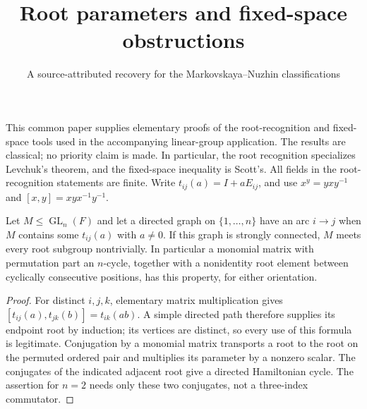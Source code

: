 \documentclass[11pt]{article}
\title{Root parameters and fixed-space obstructions}
\author{A source-attributed recovery for the Markovskaya--Nuzhin classifications}
\date{}
\newcommand{\GL}{\operatorname{GL}}\newcommand{\SL}{\operatorname{SL}}
\begin{document}
\maketitle
This common paper supplies elementary proofs of the root-recognition and
fixed-space tools used in the accompanying linear-group application. The results
are classical; no priority claim is made. In particular, the root recognition
specializes Levchuk's theorem, and the fixed-space inequality is Scott's.
All fields in the root-recognition statements are finite. Write
$t_{ij}(a)=I+aE_{ij}$, and use $x^y=yxy^{-1}$ and
$[x,y]=xyx^{-1}y^{-1}$.

\begin{lemma}\label{propagate}
Let $M\leq\GL_n(F)$ and let a directed graph on $\{1,\ldots,n\}$ have an
arc $i\to j$ when $M$ contains some $t_{ij}(a)$ with $a\ne0$.
If this graph is strongly connected, $M$ meets every root subgroup nontrivially.
In particular a monomial matrix with permutation part an $n$-cycle, together
with a nonidentity root element between cyclically consecutive positions,
has this property, for either orientation.
\end{lemma}
\begin{proof}
For distinct $i,j,k$, elementary matrix multiplication gives
$[t_{ij}(a),t_{jk}(b)]=t_{ik}(ab)$. A simple directed path therefore supplies
its endpoint root by induction; its vertices are distinct, so every use of
this formula is legitimate. Conjugation by a monomial matrix transports a
root to the root on the permuted ordered pair and multiplies its parameter
by a nonzero scalar. The conjugates of the indicated adjacent root give a
directed Hamiltonian cycle. The assertion for $n=2$ needs only these two
conjugates, not a three-index commutator.
\end{proof}
\end{document}
